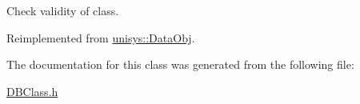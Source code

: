 Check validity of class. 



Reimplemented from \hyperlink{classunisys_1_1DataObj_af0522a53b0cbc2399c82140da8808212}{unisys\-::\-Data\-Obj}.



The documentation for this class was generated from the following file\-:\begin{DoxyCompactItemize}
\item 
\hyperlink{DBClass_8h}{D\-B\-Class.\-h}\end{DoxyCompactItemize}
